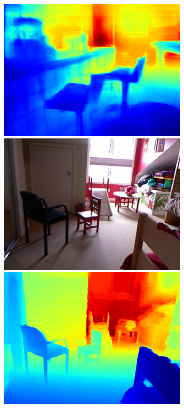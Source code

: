\begin{figure}[htb]
\begin{subfigure}{0.15\linewidth}
\begin{minipage}[t]{1\linewidth}
  \includegraphics[width=1\linewidth]{figure/nyu_without/playroom_rgb_00431.png}
  \includegraphics[width=1\linewidth]{figure/nyu_rgb/1078.png}
  \includegraphics[width=1\linewidth]{figure/nyu_gt/1078.png}

\end{minipage}
\end{subfigure}
\end{figure}
